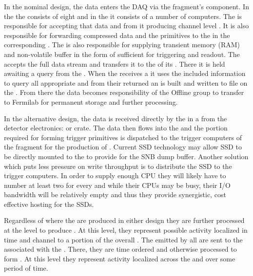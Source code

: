 In the nominal design, the data enters the DAQ via the fragment's
 component.
In the  the  consists of eight 
and in the  it consists of a number of computers.  
The  is responsible for accepting that data and from it
producing channel level .
It is also responsible for forwarding compressed data and the
primitives to the  in the corresponding .
The  is also responsible for supplying transient memory
(RAM) and non-volatile buffer in the form of  sufficient
for  triggering and readout.
The  accepts the full data stream and transfers it to the
 of its . 
There it is held awaiting a query from the . 
When the  receives a  it uses the
included information to query all appropriate  and from
their returned  an  is built and
written to file on the . 
From there the data becomes responsibility of the Offline group to
transfer to Fermilab for permanent storage and further processing.

In the alternative design, the data is received directly by the
 in a  from the detector electronics:
  or   crate. 
The data then flows into the  and the portion required
for forming trigger primitives is dispatched to the trigger computers
of the fragment for the production of .
Current SSD technology may allow SSD to be directly mounted to the
 to provide for the SNB dump buffer. 
Another solution which puts less pressure on write throughput is to
distribute the SSD to the trigger computers. 
In order to supply enough CPU they will likely have to number at least
two for every  and while their CPUs may be busy, their I/O
bandwidth will be relatively empty and thus they provide synergistic,
cost effective hosting for the SSDs.

Regardless of where the  are produced in either
design they are further processed at the  level to
produce . 
At this level, they represent possible activity localized in time and
channel to a portion of the overall .
The  emitted by all  are sent to
the  associated with the . 
There, they are time ordered and otherwise processed to form
.
At this level they represent activity localized across the
 and over some period of time.

